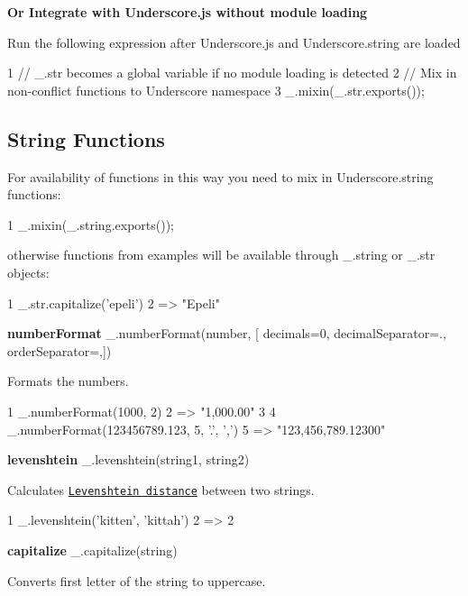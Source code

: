 {\bfseries Or Integrate with Underscore.\+js without module loading}

Run the following expression after Underscore.\+js and Underscore.\+string are loaded 
\begin{DoxyCode}
1 // \_.str becomes a global variable if no module loading is detected
2 // Mix in non-conflict functions to Underscore namespace
3 \_.mixin(\_.str.exports());
\end{DoxyCode}


\subsection*{String Functions}

For availability of functions in this way you need to mix in Underscore.\+string functions\+:


\begin{DoxyCode}
1 \_.mixin(\_.string.exports());
\end{DoxyCode}


otherwise functions from examples will be available through \+\_\+.\+string or \+\_\+.\+str objects\+:


\begin{DoxyCode}
1 \_.str.capitalize('epeli')
2 => "Epeli"
\end{DoxyCode}


{\bfseries number\+Format} \+\_\+.\+number\+Format(number, \mbox{[} decimals=0, decimal\+Separator=\textquotesingle{}.\textquotesingle{}, order\+Separator=\textquotesingle{},\textquotesingle{}\mbox{]})

Formats the numbers.


\begin{DoxyCode}
1 \_.numberFormat(1000, 2)
2 => "1,000.00"
3 
4 \_.numberFormat(123456789.123, 5, '.', ',')
5 => "123,456,789.12300"
\end{DoxyCode}


{\bfseries levenshtein} \+\_\+.\+levenshtein(string1, string2)

Calculates \href{http://en.wikipedia.org/wiki/Levenshtein_distance}{\tt Levenshtein distance} between two strings.


\begin{DoxyCode}
1 \_.levenshtein('kitten', 'kittah')
2 => 2
\end{DoxyCode}


{\bfseries capitalize} \+\_\+.\+capitalize(string)

Converts first letter of the string to uppercase.


